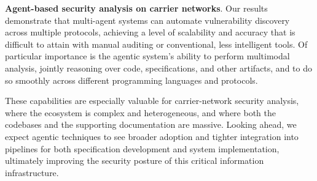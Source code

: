 \vspace{2pt}\noindent\textbf{Agent-based security analysis on carrier networks}. 
Our results demonstrate that multi-agent systems can automate vulnerability discovery across multiple protocols, achieving a level of scalability and accuracy that is difficult to attain with manual auditing or conventional, less intelligent tools. Of particular importance is the agentic system’s ability to perform multimodal analysis, jointly reasoning over code, specifications, and other artifacts, and to do so smoothly across different programming languages and protocols.

These capabilities are especially valuable for carrier-network security analysis, where the ecosystem is complex and heterogeneous, and where both the codebases and the supporting documentation are massive. Looking ahead, we expect agentic techniques to see broader adoption and tighter integration into pipelines for both specification development and system implementation, ultimately improving the security posture of this critical information infrastructure.
